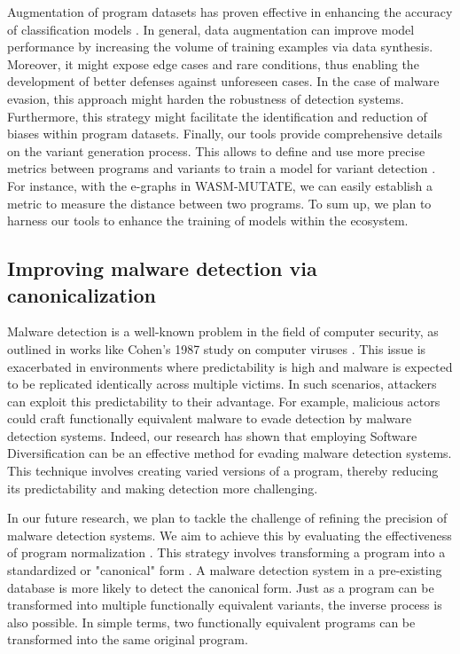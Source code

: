 Augmentation of program datasets has proven effective in enhancing the accuracy of classification models \cite{2021arXiv210311882S, selfAPR, 10.1109/TSE.2023.3240118}.
In general, data augmentation can improve model performance by increasing the volume of training examples via data synthesis.
Moreover, it might expose edge cases and rare conditions, thus enabling the development of better defenses against unforeseen cases.
In the case of malware evasion, this approach might harden the robustness of detection systems.
Furthermore, this strategy might facilitate the identification and reduction of biases within \Wasm program datasets. 
Finally, our tools provide comprehensive details on the variant generation process. 
This allows to define and use more precise metrics between programs and variants to train a model for variant detection \cite{li2023rethinking}. 
For instance, with the e-graphs in WASM-MUTATE, we can easily establish a metric to measure the distance between two programs. 
To sum up, we plan to harness our tools to enhance the training of models within the \Wasm ecosystem. 


\vspace{-0.3cm}
\subsection{Improving \Wasm malware detection via canonicalization}

Malware detection is a well-known problem in the field of computer security, as outlined in works like Cohen's 1987 study on computer viruses \cite{cohen1987computer}. 
This issue is exacerbated in environments where predictability is high and malware is expected to be replicated identically across multiple victims. 
In such scenarios, attackers can exploit this predictability to their advantage. 
For example, malicious actors could craft functionally equivalent malware to evade detection by malware detection systems.
Indeed, our research has shown that employing Software Diversification can be an effective method for evading malware detection systems. 
This technique involves creating varied versions of a program, thereby reducing its predictability and making detection more challenging. 


In our future research, we plan to tackle the challenge of refining the precision of malware detection systems. 
We aim to achieve this by evaluating the effectiveness of program normalization \cite{seideman2023transformation}. 
This strategy involves transforming a program into a standardized or "canonical" form \cite{Huang2017BinSequenceFA}.
A malware detection system in a pre-existing database is more likely to detect the canonical form.
Just as a program can be transformed into multiple functionally equivalent variants, the inverse process is also possible. 
In simple terms, two functionally equivalent programs can be transformed into the same original program. 



